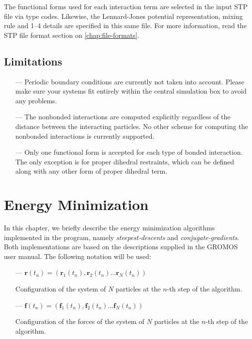 \documentclass[10pt,a4paper,openany]{memoir}
\numberwithin{equation}{section}
\newcommand{\rsub}[1]{\mathbf{r}_{#1}}
\newcommand{\fsub}[1]{\mathbf{f}_{#1}}
\begin{document}
The functional forms used for each interaction term are selected in
the input STP file via type codes. Likewise, the Lennard-Jones
potential representation, mixing rule and 1--4 details are specified
in this same file. For more information, read the STP file format
section on \autoref{chap:file-formats}.

\section{Limitations}
\label{sec:limitations}

\begin{itemize}
\item[---] Periodic boundary conditions are currently not taken into
  account. Please make sure your systems fit entirely within the
  central simulation box to avoid any problems.
\item[---] The nonbonded interactions are computed explicitly
  regardless of the distance between the interacting particles. No
  other scheme for computing the nonbonded interactions is currently
  supported.
\item[---] Only one functional form is accepted for each type of
  bonded interaction. The only exception is for proper dihedral
  restraints, which can be defined along with any other form of proper
  dihedral term. 
\end{itemize}

\chapter{Energy Minimization}
\label{chap:minim}

In this chapter, we briefly describe the energy minimization algorithms implemented in the program, namely
\textit{steepest-descents} and
\textit{conjugate-gradients}.
Both implementations are based on the descriptions supplied in the GROMOS user manual\cite{GROMOS-doc}.
The following notation will be used:

\begin{itemize}
\item [---] $\mathbf{r}(t_n) = (\rsub{1}(t_n),\rsub{2}(t_n)\ldots\rsub{N}(t_n))$
  \par
  \hspace{10ex}
  Configuration of the system of $N$ particles at the $n$-th step of the algorithm.
\item [---] $\mathbf{f}(t_n) = (\fsub{1}(t_n),\fsub{2}(t_n)\ldots\fsub{N}(t_n))$
  \par
  \hspace{10ex}
  Configuration of the forces of the system of $N$ particles at the $n$-th step of the algorithm.
\end{itemize}
\end{document}
